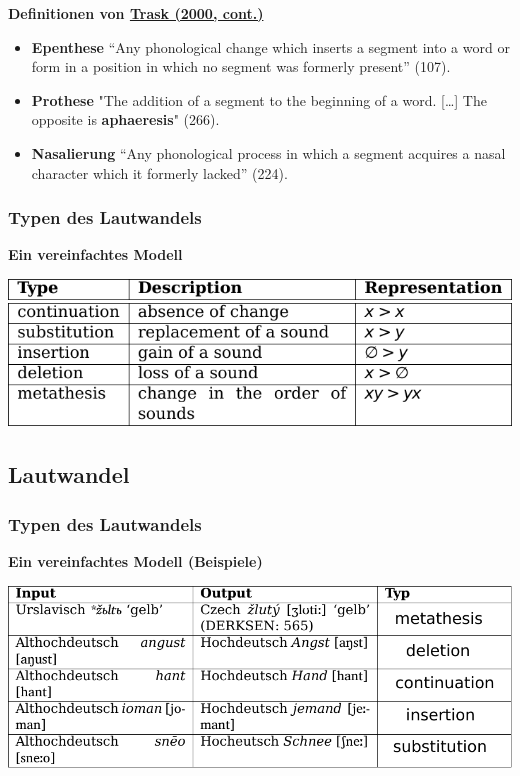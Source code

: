 \par\noindent\textbf{Definitionen von
\href{http://bibliography.lingpy.org?key=Trask2000}{Trask (2000,
cont.)}}

\begin{itemize}
\itemsep1pt\parskip0pt
\item
  \textbf{Epenthese} ``Any phonological change which inserts a segment
  into a word or form in a position in which no segment was formerly
  present'' (107).
\item
  \textbf{Prothese} "The addition of a segment to the beginning of a
  word. {[}\ldots{}{]} The opposite is \textbf{aphaeresis}" (266).
\item
  \textbf{Nasalierung} ``Any phonological process in which a segment
  acquires a nasal character which it formerly lacked'' (224).
\end{itemize}

\subsubsection{\texorpdfstring{{Typen des
Lautwandels}}{Typen des Lautwandels}}

\par\noindent\textbf{Ein vereinfachtes Modell}

\includegraphics[width=\textwidth]{img/indel.pdf}

\subsection{\texorpdfstring{{Lautwandel}}{Lautwandel}}

\subsubsection{\texorpdfstring{{Typen des
Lautwandels}}{Typen des Lautwandels}}

\par\noindent\textbf{Ein vereinfachtes Modell (Beispiele)}

\includegraphics[width=\textwidth]{img/indel-concrete.pdf}


